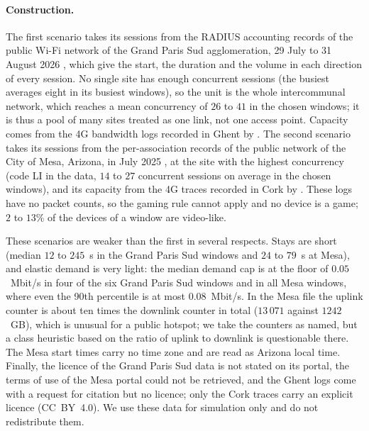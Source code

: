 \paragraph{Construction.}
The first scenario takes its sessions from the RADIUS accounting records of the public Wi-Fi network of the Grand Paris Sud agglomeration, 29 July to 31 August 2026 \citep{grandparissud2026wifi}, which give the start, the duration and the volume in each direction of every session.
No single site has enough concurrent sessions (the busiest averages eight in its busiest windows), so the unit is the whole intercommunal network, which reaches a mean concurrency of $26$ to $41$ in the chosen windows; it is thus a pool of many sites treated as one link, not one access point.
Capacity comes from the 4G bandwidth logs recorded in Ghent by \citet{vanderhooft2016http2}.
The second scenario takes its sessions from the per-association records of the public network of the City of Mesa, Arizona, in July 2025 \citep{mesa2026wifi}, at the site with the highest concurrency (code LI in the data, $14$ to $27$ concurrent sessions on average in the chosen windows), and its capacity from the 4G traces recorded in Cork by \citet{raca2018beyond4g}.
These logs have no packet counts, so the gaming rule cannot apply and no device is a game; $2$ to $13\%$ of the devices of a window are video-like.

These scenarios are weaker than the first in several respects.
Stays are short (median $12$ to $245$~s in the Grand Paris Sud windows and $24$ to $79$~s at Mesa), and elastic demand is very light: the median demand cap is at the floor of $0.05$~Mbit/s in four of the six Grand Paris Sud windows and in all Mesa windows, where even the 90th percentile is at most $0.08$~Mbit/s.
In the Mesa file the uplink counter is about ten times the downlink counter in total ($13\,071$ against $1242$~GB), which is unusual for a public hotspot; we take the counters as named, but a class heuristic based on the ratio of uplink to downlink is questionable there.
The Mesa start times carry no time zone and are read as Arizona local time.
Finally, the licence of the Grand Paris Sud data is not stated on its portal, the terms of use of the Mesa portal could not be retrieved, and the Ghent logs come with a request for citation but no licence; only the Cork traces carry an explicit licence (CC~BY~4.0). We use these data for simulation only and do not redistribute them.

